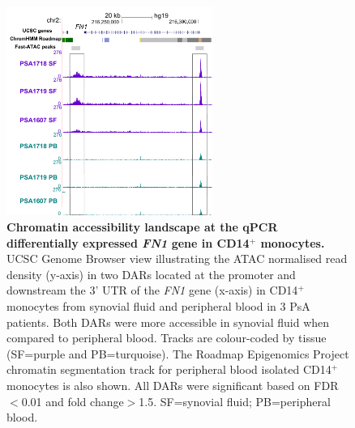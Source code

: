 \begin{figure}[htbp]
\centering
\includegraphics[width=0.6\textwidth]{./Results3/pdfs/PSA_CD14_ATAC_FN1_paired_gene_expression}
\caption[Chromatin accessibility landscape at the qPCR differentially expressed \textit{FN1} gene in CD14$^+$ monocytes.]{\textbf{Chromatin accessibility landscape at the qPCR differentially expressed \textit{FN1} gene in CD14$^+$ monocytes.} UCSC Genome Browser view illustrating the ATAC normalised read density (y-axis) in two DARs located at the promoter and downstream the 3' UTR of the \textit{FN1} gene (x-axis) in CD14$^+$ monocytes from synovial fluid and peripheral blood in 3 PsA patients. Both DARs were more accessible in synovial fluid when compared to peripheral blood. Tracks are colour-coded by tissue (SF=purple and PB=turquoise). The Roadmap Epigenomics Project chromatin segmentation track for peripheral blood isolated CD14$^+$ monocytes is also shown. All DARs were significant based on FDR$<$0.01 and fold change$>$1.5. SF=synovial fluid; PB=peripheral blood.}
\label{figure:PSA_CD14_ATAC_FN1}
\end{figure}



